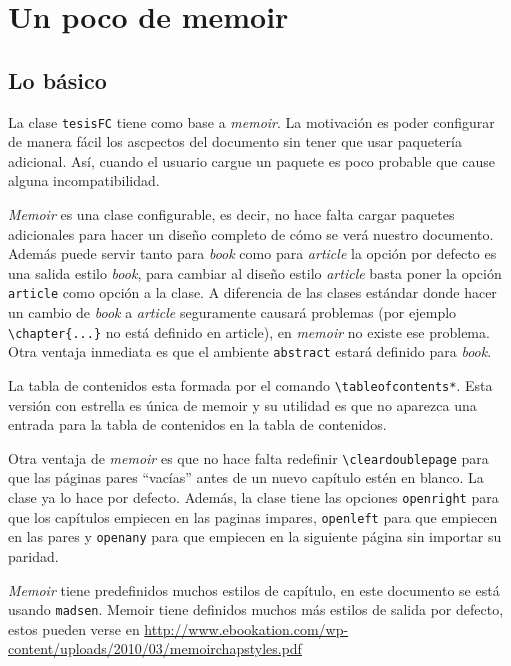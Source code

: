 
\chapter{Un poco de memoir}


\section{Lo básico}
La clase \texttt{tesisFC} tiene como base a \textit{memoir}. La motivación es poder configurar de manera fácil los ascpectos del documento sin tener que usar paquetería adicional. Así, cuando el usuario cargue un paquete es poco probable que cause alguna incompatibilidad.

\textit{Memoir} es una clase configurable, es decir, no hace falta cargar paquetes adicionales para hacer un diseño completo de cómo se verá nuestro
documento. Además puede servir tanto para \textit{book} como para \textit{article} la opción por defecto es una salida estilo \textit{book}, para cambiar al diseño estilo \textit{article} basta poner la opción \texttt{article} como opción a la clase. A diferencia de las clases
estándar donde hacer un cambio de \textit{book} a \textit{article} seguramente causará problemas (por ejemplo \verb|\chapter{...}| no está
definido en article), en \textit{memoir} no existe ese problema. Otra ventaja inmediata es que el ambiente \texttt{abstract} estará definido para \textit{book}.

La tabla de contenidos esta formada por el comando
\verb|\tableofcontents*|. Esta versión con estrella es única de memoir y su
utilidad es que no aparezca una entrada para la tabla de contenidos en la
tabla de contenidos.

Otra ventaja de \textit{memoir} es que no hace falta redefinir
\verb|\cleardoublepage| para que las páginas pares ``vacías'' antes de un
nuevo capítulo estén en blanco. La clase ya lo hace por defecto. Además, la
clase tiene las opciones \texttt{openright} para que los capítulos empiecen
en las paginas impares, \texttt{openleft} para que empiecen en las pares y
\texttt{openany} para que empiecen en la siguiente página sin importar su
paridad.

\textit{Memoir} tiene predefinidos muchos estilos de capítulo, en este documento se está usando \texttt{madsen}. Memoir tiene
definidos muchos más estilos de salida por defecto, estos pueden verse en
\url{http://www.ebookation.com/wp-content/uploads/2010/03/memoirchapstyles.pdf}


